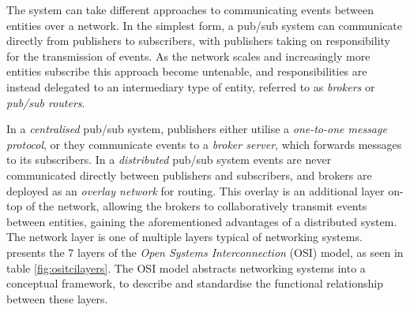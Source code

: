 \documentclass[../report.tex]{subfiles}
\begin{document}
The system can take different approaches to communicating events between entities over a network. In the simplest form, a pub/sub system can communicate directly from publishers to subscribers, with publishers taking on responsibility for the transmission of events. As the network scales and increasingly more entities subscribe this approach become untenable, and responsibilities are instead delegated to an intermediary type of entity, referred to as \textit{brokers} or \textit{pub/sub routers}.

In a \textit{centralised} pub/sub system, publishers either utilise a \textit{one-to-one message protocol}, or they communicate events to a \textit{broker server}, which forwards messages to its subscribers. In a \textit{distributed} pub/sub system events are never communicated directly between publishers and subscribers, and brokers are deployed as an \textit{overlay network} for routing. This overlay is an additional layer on-top of the network, allowing the brokers to collaboratively transmit events between entities, gaining the aforementioned advantages of a distributed system. \\

The network layer is one of multiple layers typical of networking systems. \cite{alani2014guide} presents the 7 layers of the \textit{Open Systems Interconnection} (OSI) model, as seen in table \ref{fig:ositcilayers}. The OSI model abstracts networking systems into a conceptual framework, to describe and standardise the functional relationship between these layers. \\
\end{document}
